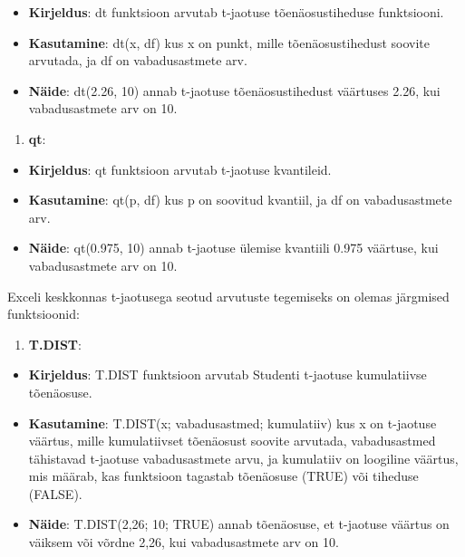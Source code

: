 \documentclass[
]{book}
\providecommand{\tightlist}{%
  \setlength{\itemsep}{0pt}\setlength{\parskip}{0pt}}
\begin{document}
\begin{itemize}
\tightlist
\item
  \textbf{Kirjeldus}: dt funktsioon arvutab t-jaotuse tõenäosustiheduse funktsiooni.
\item
  \textbf{Kasutamine}: dt(x, df) kus x on punkt, mille tõenäosustihedust soovite arvutada, ja df on vabadusastmete arv.
\item
  \textbf{Näide}: dt(2.26, 10) annab t-jaotuse tõenäosustihedust väärtuses 2.26, kui vabadusastmete arv on 10.
\end{itemize}

\begin{enumerate}
\def\labelenumi{\arabic{enumi}.}
\setcounter{enumi}{2}
\tightlist
\item
  \textbf{qt}:
\end{enumerate}

\begin{itemize}
\tightlist
\item
  \textbf{Kirjeldus}: qt funktsioon arvutab t-jaotuse kvantileid.
\item
  \textbf{Kasutamine}: qt(p, df) kus p on soovitud kvantiil, ja df on vabadusastmete arv.
\item
  \textbf{Näide}: qt(0.975, 10) annab t-jaotuse ülemise kvantiili 0.975 väärtuse, kui vabadusastmete arv on 10.
\end{itemize}

Exceli keskkonnas t-jaotusega seotud arvutuste tegemiseks on olemas järgmised funktsioonid:

\begin{enumerate}
\def\labelenumi{\arabic{enumi}.}
\tightlist
\item
  \textbf{T.DIST}:
\end{enumerate}

\begin{itemize}
\tightlist
\item
  \textbf{Kirjeldus}: T.DIST funktsioon arvutab Studenti t-jaotuse kumulatiivse tõenäosuse.
\item
  \textbf{Kasutamine}: T.DIST(x; vabadusastmed; kumulatiiv) kus x on t-jaotuse väärtus, mille kumulatiivset tõenäosust soovite arvutada, vabadusastmed tähistavad t-jaotuse vabadusastmete arvu, ja kumulatiiv on loogiline väärtus, mis määrab, kas funktsioon tagastab tõenäosuse (TRUE) või tiheduse (FALSE).
\item
  \textbf{Näide}: T.DIST(2,26; 10; TRUE) annab tõenäosuse, et t-jaotuse väärtus on väiksem või võrdne 2,26, kui vabadusastmete arv on 10.
\end{itemize}
\end{document}
